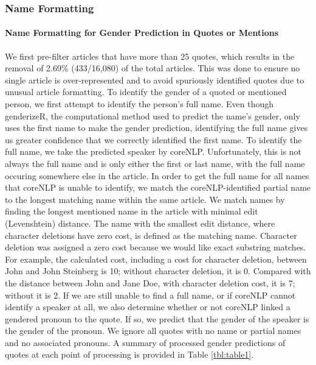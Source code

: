 \hypertarget{name-formatting}{%
\subsubsection{Name Formatting}\label{name-formatting}}

\hypertarget{name-formatting-for-gender-prediction-in-quotes-or-mentions}{%
\paragraph{Name Formatting for Gender Prediction in Quotes or Mentions}\label{name-formatting-for-gender-prediction-in-quotes-or-mentions}}

We first pre-filter articles that have more than 25 quotes, which results in the removal of 2.69\% (433/16,080) of the total articles.
This was done to ensure no single article is over-represented and to avoid spuriously identified quotes due to unusual article formatting.
To identify the gender of a quoted or mentioned person, we first attempt to identify the person's full name.
Even though genderizeR, the computational method used to predict the name's gender, only uses the first name to make the gender prediction, identifying the full name gives us greater confidence that we correctly identified the first name.
To identify the full name, we take the predicted speaker by coreNLP.
Unfortunately, this is not always the full name and is only either the first or last name, with the full name occuring somewhere else in the article.
In order to get the full name for all names that coreNLP is unable to identify, we match the coreNLP-identified partial name to the longest matching name within the same article.
We match names by finding the longest mentioned name in the article with minimal edit (Levenshtein) distance.
The name with the smallest edit distance, where character deletions have zero cost, is defined as the matching name.
Character deletion was assigned a zero cost because we would like exact substring matches.
For example, the calculated cost, including a cost for character deletion, between John and John Steinberg is 10; without character deletion, it is 0.
Compared with the distance between John and Jane Doe, with character deletion cost, it is 7; without it is 2.
If we are still unable to find a full name, or if coreNLP cannot identify a speaker at all, we also determine whether or not coreNLP linked a gendered pronoun to the quote.
If so, we predict that the gender of the speaker is the gender of the pronoun.
We ignore all quotes with no name or partial names and no associated pronouns.
A summary of processed gender predictions of quotes at each point of processing is provided in Table \ref{tbl:table1}.

